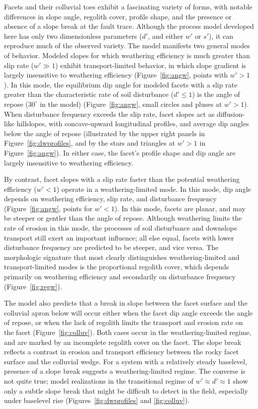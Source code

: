 Facets and their colluvial toes exhibit a fascinating variety of forms, with notable differences in slope angle, regolith cover, profile shape, and the presence or absence of a slope break at the fault trace. Although the process model developed here has only two dimensionless parameters ($d'$, and either $w'$ or $s'$), it can reproduce much of the observed variety. The model manifests two general modes of behavior. Modeled slopes for which weathering efficiency is much greater than slip rate ($w' \gg 1$) exhibit transport-limited behavior, in which slope gradient is largely insensitive to weathering efficiency (Figure~\ref{fig:angw}, points with $w' > 1$). In this mode, the equilibrium dip angle for modeled facets with a slip rate greater than the characteristic rate of soil disturbance ($d' \le 1$) is the angle of repose ($30^\circ$ in the model) (Figure~\ref{fig:angw}, small circles and pluses at $w'>1$). When disturbance frequency exceeds the slip rate, facet slopes act as diffusion-like hillslopes, with concave-upward longitudinal profiles, and average dip angles below the angle of repose (illustrated by the upper right panels in Figure~\ref{fig:dwprofiles}, and by the stars and triangles at $w' > 1$ in Figure~\ref{fig:angw}). In either case, the facet's profile shape and dip angle are largely insensitive to weathering efficiency.

By contrast, facet slopes with a slip rate faster than the potential weathering efficiency ($w'<1$) operate in a weathering-limited mode. In this mode, dip angle depends on weathering efficiency, slip rate, and disturbance frequency (Figure~\ref{fig:angw}, points for $w'<1$). In this mode, facets are planar, and may be steeper or gentler than the angle of repose. Although weathering limits the rate of erosion in this mode, the processes of soil disturbance and downslope transport still exert an important influence; all else equal, facets with lower disturbance frequency are predicted to be steeper, and vice versa. The morphologic signature that most clearly distinguishes weathering-limited and transport-limited modes is the proportional regolith cover, which depends primarily on weathering efficiency and secondarily on disturbance frequency (Figure~\ref{fig:regw}).

The model also predicts that a break in slope between the facet surface and the colluvial apron below will occur either when the facet dip angle exceeds the angle of repose, or when the lack of regolith limits the transport and erosion rate on the facet (Figure~\ref{fig:colluv}).  Both cases occur in the weathering-limited regime, and are marked by an incomplete regolith cover on the facet. The slope break reflects a contrast in erosion and transport efficiency between the rocky facet surface and the colluvial wedge. For a system with a relatively steady baselevel, presence of a slope break suggests a weathering-limited regime. The converse is not quite true; model realizations in the transitional regime of $w'\approx d' \approx 1$ show only a subtle slope break that might be difficult to detect in the field, especially under baselevel rise (Figures~\ref{fig:dwprofiles} and \ref{fig:colluv}). 


